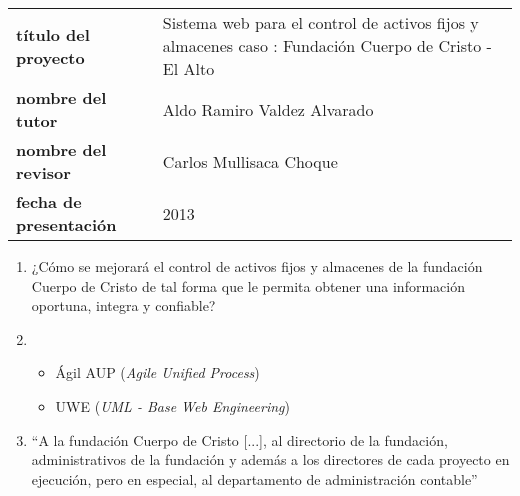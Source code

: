 \begin{tabular}{p{}p{}}
\textbf{título del proyecto} & Sistema web para el control de activos fijos y almacenes caso : Fundación Cuerpo de Cristo - El Alto \\
\textbf{nombre del tutor} & Aldo Ramiro Valdez Alvarado \\
\textbf{nombre del revisor} & Carlos Mullisaca Choque \\
\textbf{fecha de presentación} & 2013
\end{tabular}

\begin{enumerate}[1]
\item ¿Cómo se mejorará el control de activos fijos y almacenes de la fundación Cuerpo de Cristo de tal forma que le permita obtener una información oportuna, integra y confiable?
\item
  \begin{itemize}
  \item Ágil AUP (\textit{Agile Unified Process})
  \item UWE (\textit{UML - Base Web Engineering})
  \end{itemize}
\item ``A la fundación Cuerpo de Cristo [...], al directorio de la fundación, administrativos de la fundación y además a los directores de cada proyecto en ejecución, pero en especial, al departamento de administración contable''

\end{enumerate}
